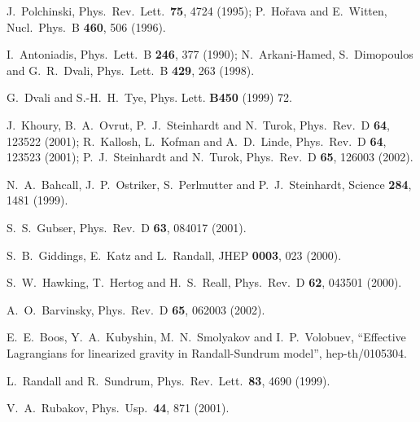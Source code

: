 \documentclass[a4paper,12pt]{article}
\begin{document}
\begin{thebibliography}{9}J.~Polchinski,
Phys.\ Rev.\ Lett.\  {\bf 75}, 4724 (1995);
P.~Ho\v{r}ava and E.~Witten,
Nucl.\ Phys.\ B {\bf 460}, 506 (1996).

 I.~Antoniadis,
Phys.\ Lett.\ B {\bf 246}, 377 (1990);
N.~Arkani-Hamed, S.~Dimopoulos and G.~R.~Dvali,
Phys.\ Lett.\ B {\bf 429}, 263 (1998).

 G.~Dvali and S.-H.~H.~Tye, Phys. Lett. {\bf B450}
(1999) 72.

J.~Khoury, B.~A.~Ovrut, P.~J.~Steinhardt and N.~Turok,
Phys.\ Rev.\ D {\bf 64}, 123522 (2001);
R.~Kallosh, L.~Kofman and A.~D.~Linde,
Phys.\ Rev.\ D {\bf 64}, 123523 (2001);
P.~J.~Steinhardt and N.~Turok,
Phys.\ Rev.\ D {\bf 65}, 126003 (2002).

N.~A.~Bahcall, J.~P.~Ostriker, S.~Perlmutter and P.~J.~Steinhardt,
Science {\bf 284}, 1481 (1999).

 S.~S.~Gubser,
Phys.\ Rev.\ D {\bf 63}, 084017 (2001).

 S.~B.~Giddings, E.~Katz and L.~Randall,
JHEP {\bf 0003}, 023 (2000).

 S.~W.~Hawking, T.~Hertog and H.~S.~Reall,
Phys.\ Rev.\ D {\bf 62}, 043501 (2000).

 A.~O.~Barvinsky,
Phys.\ Rev.\ D {\bf 65}, 062003 (2002).

 E.~E.~Boos, Y.~A.~Kubyshin, M.~N.~Smolyakov
and I.~P.~Volobuev, ``Effective Lagrangians for linearized
gravity in Randall-Sundrum model'', hep-th/0105304.

 L.~Randall and R.~Sundrum,
Phys.\ Rev.\ Lett.\  {\bf 83}, 4690 (1999).

 V.~A.~Rubakov,
Phys.\ Usp.\  {\bf 44}, 871 (2001).


\end{thebibliography}
\end{document}
